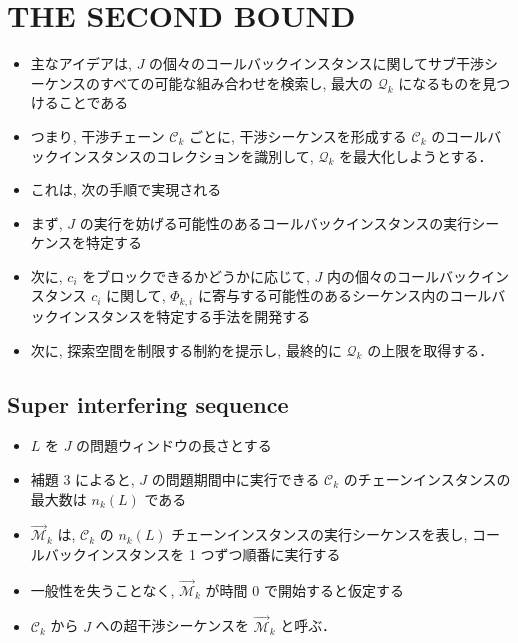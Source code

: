 
\section{THE SECOND BOUND}
\label{sec: the_second_bound}

\begin{frame}{}
    \begin{itemize}
        \item 主なアイデアは, $J$ の個々のコールバックインスタンスに関してサブ干渉シーケンスのすべての可能な組み合わせを検索し, 最大の $\mathcal{Q}_{k}$ になるものを見つけることである
        \item つまり, 干渉チェーン $\mathcal{C}_{k}$ ごとに, 干渉シーケンスを形成する $\mathcal{C}_{k}$ のコールバックインスタンスのコレクションを識別して, $\mathcal{Q}_{k}$ を最大化しようとする．
    \end{itemize}
\end{frame}

\begin{frame}{}
    \begin{itemize}
        \item これは, 次の手順で実現される
        \item まず,  $J$ の実行を妨げる可能性のあるコールバックインスタンスの実行シーケンスを特定する
        \item 次に, $c_{i}$ をブロックできるかどうかに応じて, $J$ 内の個々のコールバックインスタンス $c_{i}$ に関して, $\Phi_{k, i}$ に寄与する可能性のあるシーケンス内のコールバックインスタンスを特定する手法を開発する
        \item 次に, 探索空間を制限する制約を提示し, 最終的に $\mathcal{Q}_{k}$ の上限を取得する．
    \end{itemize}
\end{frame}

\subsection{Super interfering sequence}
\label{ssec: super_interfering_sequence}

\begin{frame}{}
    \begin{itemize}
        \item $L$ を $J$ の問題ウィンドウの長さとする
        \item 補題 3 によると,  $J$ の問題期間中に実行できる $\mathcal{C}_{k}$ のチェーンインスタンスの最大数は $n_{k}(L)$ である
        \item $\overrightarrow{\mathcal{M}}_{k}$ は, $\mathcal{C}_{k}$ の $n_{k}(L)$ チェーンインスタンスの実行シーケンスを表し, コールバックインスタンスを 1 つずつ順番に実行する
        \item 一般性を失うことなく,  $\overrightarrow{\mathcal{M}}_{k}$ が時間 0 で開始すると仮定する
        \item $\mathcal{C}_{k}$ から $J$ への超干渉シーケンスを $\overrightarrow{\mathcal{M}}_{k}$ と呼ぶ．
    \end{itemize}
\end{frame}

